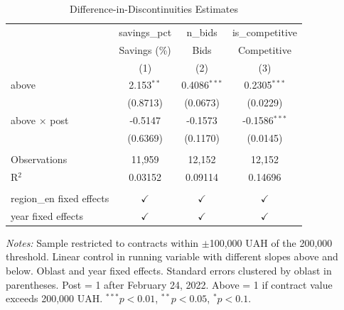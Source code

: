 
\begin{table}[htbp]
   \caption{\label{tab:did} Difference-in-Discontinuities Estimates}
   \bigskip
   \centering
   \begin{tabular}{lccc}
      \toprule
                                & savings\_pct  & n\_bids        & is\_competitive\\   
                                & Savings (\%)  & Bids           & Competitive \\   
                                & (1)           & (2)            & (3)\\  
      \midrule 
      above                     & 2.153$^{**}$  & 0.4086$^{***}$ & 0.2305$^{***}$\\   
                                & (0.8713)      & (0.0673)       & (0.0229)\\   
      above $\times$ post       & -0.5147       & -0.1573        & -0.1586$^{***}$\\   
                                & (0.6369)      & (0.1170)       & (0.0145)\\   
       \\
      Observations              & 11,959        & 12,152         & 12,152\\  
      R$^2$                     & 0.03152       & 0.09114        & 0.14696\\  
       \\
      region\_en fixed effects  & $\checkmark$  & $\checkmark$   & $\checkmark$\\   
      year fixed effects        & $\checkmark$  & $\checkmark$   & $\checkmark$\\   
      \bottomrule
   \end{tabular}
   
   \par \raggedright \footnotesize
   \textit{Notes:} Sample restricted to contracts within $\pm$100,000 UAH of the 200,000 threshold. Linear control in running variable with different slopes above and below. Oblast and year fixed effects. Standard errors clustered by oblast in parentheses. Post = 1 after February 24, 2022. Above = 1 if contract value exceeds 200,000 UAH. $^{***}p<0.01$, $^{**}p<0.05$, $^{*}p<0.1$.
\end{table}


